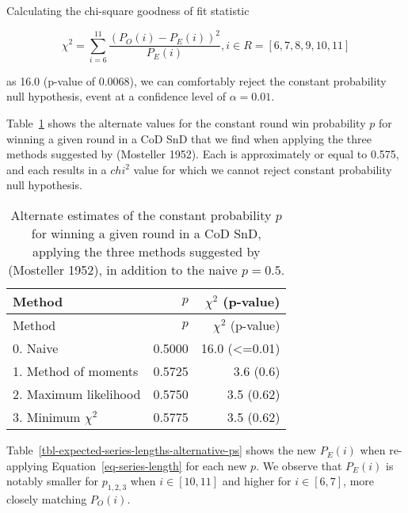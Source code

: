 \documentclass[
]{article}
\begin{document}
Calculating the chi-square goodness of fit statistic

\[
\chi^2 = \sum^{11}_{i=6} \frac{(P_O(i) - P_E(i))^2}{P_E(i)}, i \in R = [6, 7, 8, 9, 10, 11]
\]

as 16.0 (p-value of 0.0068), we can comfortably reject the constant
probability null hypothesis, event at a confidence level of
\(\alpha = 0.01\).

Table~\ref{tbl-mosteller-methods} shows the alternate values for the
constant round win probability \(p\) for winning a given round in a CoD
SnD that we find when applying the three methods suggested by (Mosteller
1952). Each is approximately or equal to 0.575, and each results in a
\(chi^2\) value for which we cannot reject constant probability null
hypothesis.

\hypertarget{tbl-mosteller-methods}{}
\begin{longtable}[]{@{}lrr@{}}
\caption{\label{tbl-mosteller-methods}Alternate estimates of the
constant probability \(p\) for winning a given round in a CoD SnD,
applying the three methods suggested by (Mosteller 1952), in addition to
the naive \(p = 0.5\).}\tabularnewline
\toprule()
Method & \(p\) & \(\chi^2\) (p-value) \\
\midrule()
\endfirsthead
\toprule()
Method & \(p\) & \(\chi^2\) (p-value) \\
\midrule()
\endhead
0. Naive & 0.5000 & 16.0 (\textless=0.01) \\
1. Method of moments & 0.5725 & 3.6 (0.6) \\
2. Maximum likelihood & 0.5750 & 3.5 (0.62) \\
3. Minimum \(\chi^2\) & 0.5775 & 3.5 (0.62) \\
\bottomrule()
\end{longtable}

Table~\ref{tbl-expected-series-lengths-alternative-ps} shows the new
\(P_E(i)\) when re-applying Equation~\ref{eq-series-length} for each new
\(p\). We observe that \(P_E(i)\) is notably smaller for \(p_{1,2,3}\)
when \(i \in [10, 11]\) and higher for \(i \in [6, 7]\), more closely
matching \(P_O(i)\).
\end{document}
